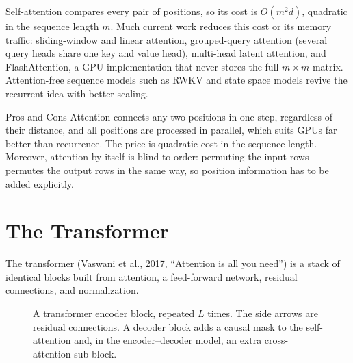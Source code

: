 Self-attention compares every pair of positions, so its cost is $O(m^2d)$, quadratic in the sequence length $m$. Much current work reduces this cost or its memory traffic: sliding-window and linear attention, grouped-query attention (several query heads share one key and value head), multi-head latent attention, and FlashAttention, a GPU implementation that never stores the full $m\times m$ matrix. Attention-free sequence models such as RWKV and state space models revive the recurrent idea with better scaling.

\begin{notebox}{Pros and Cons}
Attention connects any two positions in one step, regardless of their distance, and all positions are processed in parallel, which suits GPUs far better than recurrence. The price is quadratic cost in the sequence length. Moreover, attention by itself is blind to order: permuting the input rows permutes the output rows in the same way, so position information has to be added explicitly.
\end{notebox}

\section{The Transformer}\label{sec:transformer}

The transformer (Vaswani et al., 2017, ``Attention is all you need'') is a stack of identical blocks built from attention, a feed-forward network, residual connections, and normalization.

\begin{figure}[ht]
\centering
{}
\caption{A transformer encoder block, repeated $L$ times. The side arrows are residual connections. A decoder block adds a causal mask to the self-attention and, in the encoder--decoder model, an extra cross-attention sub-block.}
\label{fig:transformer-block}
\end{figure}

